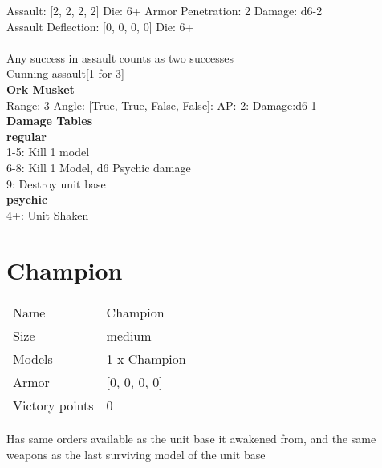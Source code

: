 Assault: [2, 2, 2, 2] Die: 6+ Armor Penetration: 2 Damage: d6-2 \\
Assault Deflection: [0, 0, 0, 0] Die: 6+\\
\\
Any success in assault counts as two successes \\
Cunning assault[1 for 3]\\ 
 



{\bf Ork Musket } \\



Range: 3  Angle: [True, True, False, False]: AP: 2: Damage:d6-1 \\




 





{\bf Damage Tables} \\
 {\bf regular } \\
1-5: Kill 1 model \\
6-8: Kill 1 Model, d6 Psychic damage \\
9: Destroy unit base \\
 {\bf psychic } \\
4+: Unit Shaken \\










\pagebreak\pagebreak

\section{ Champion }

\begin{tabular}{ll}
  Name & Champion \\
  Size & medium\\
  Models & 1 x Champion\\
  Armor & [0, 0, 0, 0]\\
  Victory points & 0\\
\end{tabular}

Has same orders available as the unit base it awakened from, and the same weapons as the last surviving model of the unit base\\ 


